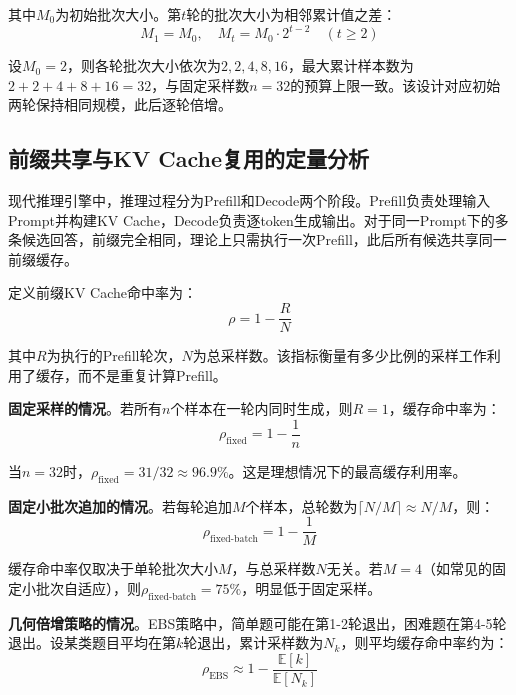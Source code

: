 其中$M_0$为初始批次大小。第$t$轮的批次大小为相邻累计值之差：
\begin{equation}
M_1 = M_0, \quad M_t = M_0 \cdot 2^{t-2} \quad (t \geq 2)
\label{eq:batch_sizes}
\end{equation}

设$M_0 = 2$，则各轮批次大小依次为$2, 2, 4, 8, 16$，最大累计样本数为$2 + 2 + 4 + 8 + 16 = 32$，与固定采样数$n = 32$的预算上限一致。该设计对应初始两轮保持相同规模，此后逐轮倍增。

\subsection{前缀共享与KV Cache复用的定量分析}
\label{subsec:kv_cache_detailed}

现代推理引擎中，推理过程分为Prefill和Decode两个阶段。Prefill负责处理输入Prompt并构建KV Cache，Decode负责逐token生成输出。对于同一Prompt下的多条候选回答，前缀完全相同，理论上只需执行一次Prefill，此后所有候选共享同一前缀缓存。

定义前缀KV Cache命中率为：
\begin{equation}
\rho = 1 - \frac{R}{N}
\label{eq:kv_cache_hitrate_def}
\end{equation}

其中$R$为执行的Prefill轮次，$N$为总采样数。该指标衡量有多少比例的采样工作利用了缓存，而不是重复计算Prefill。

\textbf{固定采样的情况}。若所有$n$个样本在一轮内同时生成，则$R = 1$，缓存命中率为：
\begin{equation}
\rho_{\text{fixed}} = 1 - \frac{1}{n}
\label{eq:fixed_hitrate}
\end{equation}

当$n = 32$时，$\rho_{\text{fixed}} = 31/32 \approx 96.9\%$。这是理想情况下的最高缓存利用率。

\textbf{固定小批次追加的情况}。若每轮追加$M$个样本，总轮数为$\lceil N / M \rceil \approx N/M$，则：
\begin{equation}
\rho_{\text{fixed-batch}} = 1 - \frac{1}{M}
\label{eq:fixed_batch_hitrate}
\end{equation}

缓存命中率仅取决于单轮批次大小$M$，与总采样数$N$无关。若$M = 4$（如常见的固定小批次自适应），则$\rho_{\text{fixed-batch}} = 75\%$，明显低于固定采样。

\textbf{几何倍增策略的情况}。EBS策略中，简单题可能在第1-2轮退出，困难题在第4-5轮退出。设某类题目平均在第$k$轮退出，累计采样数为$N_k$，则平均缓存命中率约为：
\begin{equation}
\rho_{\text{EBS}} \approx 1 - \frac{\mathbb{E}[k]}{\mathbb{E}[N_k]}
\label{eq:ebs_avg_hitrate}
\end{equation}

